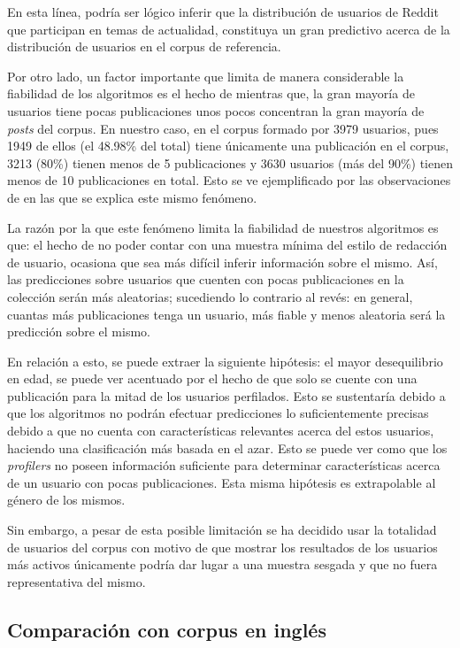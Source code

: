En esta línea, podría ser lógico inferir que la distribución de usuarios de Reddit que participan en temas de actualidad, constituya un gran predictivo acerca de la distribución de usuarios en el corpus de referencia.

Por otro lado, un factor importante que limita de manera considerable la fiabilidad de los algoritmos es el hecho de mientras que, la gran mayoría de usuarios tiene pocas publicaciones unos pocos concentran la gran mayoría de \textit{posts} del corpus. En nuestro caso, en el corpus formado por 3979 usuarios, pues 1949 de ellos (el 48.98\% del total) tiene únicamente una publicación en el corpus, 3213 (80\%) tienen menos de 5 publicaciones y 3630 usuarios (más del 90\%) tienen menos de 10 publicaciones en total. Esto se ve ejemplificado por las observaciones de \citet{heritage_BLM} en las que se explica este mismo fenómeno.

La razón por la que este fenómeno limita la fiabilidad de nuestros algoritmos es que: el hecho de no poder contar con una muestra mínima del estilo de redacción de usuario, ocasiona que sea más difícil inferir información sobre el mismo. Así, las predicciones sobre usuarios que cuenten con pocas publicaciones en la colección serán más aleatorias; sucediendo lo contrario al revés: en general, cuantas más publicaciones tenga un usuario, más fiable y menos aleatoria será la predicción sobre el mismo. 

En relación a esto, se puede extraer la siguiente hipótesis: el mayor desequilibrio en edad, se puede ver acentuado por el hecho de que solo se cuente con una publicación para la mitad de los usuarios perfilados. Esto se sustentaría  debido a que los algoritmos no podrán efectuar predicciones lo suficientemente precisas debido a que no cuenta con características relevantes acerca del estos usuarios, haciendo una clasificación más basada en el azar. Esto se puede ver como que los \textit{profilers} no poseen información suficiente para determinar características acerca de un usuario con pocas publicaciones. Esta misma hipótesis es extrapolable al género de los mismos. %

Sin embargo, a pesar de esta posible limitación se ha decidido usar la totalidad de usuarios del corpus con motivo de que mostrar los resultados de los usuarios más activos únicamente podría dar lugar a una muestra sesgada y que no fuera representativa del mismo.

\subsection{Comparación con corpus en inglés}

